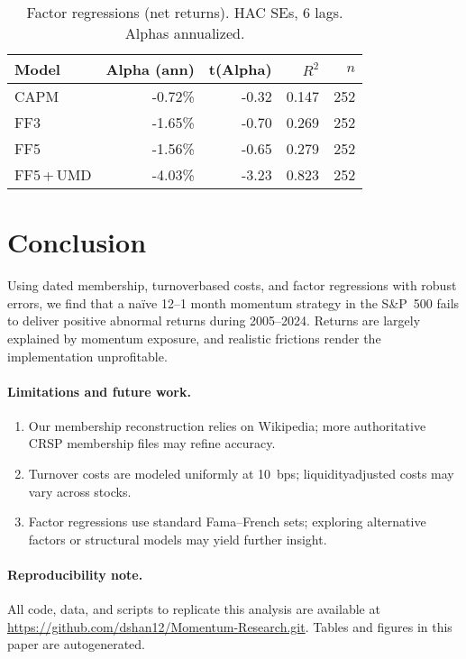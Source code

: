 \documentclass[11pt]{article}
\begin{document}
\begin{table}[!ht]
\centering
\caption{Factor regressions (net returns). HAC SEs, 6 lags. Alphas annualized.}
\label{tab:ff}
\begin{tabular}{lrrrr}
\toprule
Model & Alpha (ann) & t(Alpha) & $R^2$ & $n$ \\
\midrule
CAPM     & -0.72\% & -0.32 & 0.147 & 252 \\
FF3      & -1.65\% & -0.70 & 0.269 & 252 \\
FF5      & -1.56\% & -0.65 & 0.279 & 252 \\
FF5\,+\,UMD & -4.03\% & -3.23 & 0.823 & 252 \\
\bottomrule
\end{tabular}
\end{table}

\section{Conclusion} \label{sec:conclusion}
Using dated membership, turnover\textendash based costs, and factor regressions with robust errors, we find that a naïve 12--1 month momentum strategy in the S\&P~500 fails to deliver positive abnormal returns during 2005–2024. Returns are largely explained by momentum exposure, and realistic frictions render the implementation unprofitable.  

\paragraph{Limitations and future work.}
\begin{enumerate}[label=(\roman*), leftmargin=*]
  \item Our membership reconstruction relies on Wikipedia; more authoritative CRSP membership files may refine accuracy.  
  \item Turnover costs are modeled uniformly at 10~bps; liquidity\textendash adjusted costs may vary across stocks.  
  \item Factor regressions use standard Fama--French sets; exploring alternative factors or structural models may yield further insight.  
\end{enumerate}

\paragraph{Reproducibility note.}
All code, data, and scripts to replicate this analysis are available at \url{https://github.com/dshan12/Momentum-Research.git}. Tables and figures in this paper are auto\textendash generated.



\end{document}
